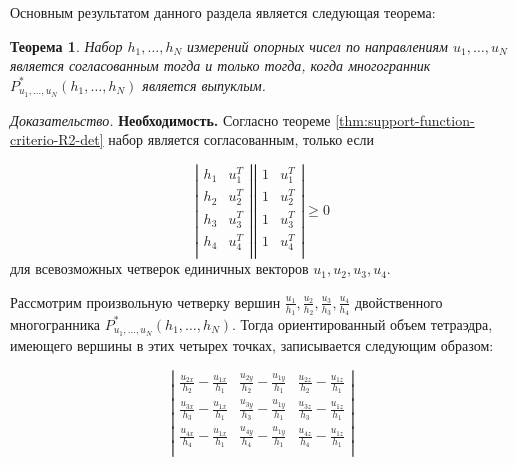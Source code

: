 \documentclass[a4paper, 12pt, titlepage]{article}
\theoremstyle{definition}
\theoremstyle{plain}
\newtheorem{SmartTheorem}{Теорема}
\theoremstyle{plain}
\begin{document}
Основным результатом данного раздела является следующая теорема:

\begin{SmartTheorem}
 Набор $h_{1}, \ldots, h_{N}$ измерений опорных чисел по направлениям $u_{1},
 \ldots, u_{N}$ является согласованным тогда и только тогда, когда многогранник
 $P^{*}_{u_{1}, \ldots, u_{N}}(h_{1}, \ldots, h_{N})$ является выпуклым.
\end{SmartTheorem}

\textit{Доказательство.} \textbf{Необходимость.} Согласно теореме
\ref{thm:support-function-criterio-R2-det} набор является согласованным,
только если

\begin{equation}
\left|\begin{array}{cc}
  h_{1} & u_{1}^{T} \\
  h_{2} & u_{2}^{T} \\
  h_{3} & u_{3}^{T} \\
  h_{4} & u_{4}^{T} \\
\end{array}\right|
  \left|\begin{array}{cc}
  1 & u_{1}^{T} \\
  1 & u_{2}^{T} \\
  1 & u_{3}^{T} \\
  1 & u_{4}^{T} \\
\end{array}\right|
\geq 0
\end{equation}
для всевозможных четверок единичных векторов $u_{1}, u_{2}, u_{3}, u_{4}$.

Рассмотрим произвольную четверку вершин $\frac{u_{1}}{h_{1}},
\frac{u_{2}}{h_{2}},  \frac{u_{3}}{h_{3}}, \frac{u_{4}}{h_{4}}$ двойственного
многогранника $P^{*}_{u_{1}, \ldots, u_{N}}(h_{1}, \ldots, h_{N})$. Тогда
ориентированный объем тетраэдра, имеющего вершины в этих четырех точках,
записывается следующим образом:

\begin{equation}
\left|\begin{array}{ccc}
  \frac{u_{2x}}{h_{2}} - \frac{u_{1x}}{h_{1}} &
  \frac{u_{2y}}{h_{2}} - \frac{u_{1y}}{h_{1}} &
  \frac{u_{2z}}{h_{2}} - \frac{u_{1z}}{h_{1}} \\
  \frac{u_{3x}}{h_{3}} - \frac{u_{1x}}{h_{1}} &
  \frac{u_{3y}}{h_{3}} - \frac{u_{1y}}{h_{1}} &
  \frac{u_{3z}}{h_{3}} - \frac{u_{1z}}{h_{1}} \\
  \frac{u_{4x}}{h_{4}} - \frac{u_{1x}}{h_{1}} &
  \frac{u_{4y}}{h_{4}} - \frac{u_{1y}}{h_{1}} &
  \frac{u_{4z}}{h_{4}} - \frac{u_{1z}}{h_{1}} \\
\end{array}\right|
\end{equation}
\end{document}
